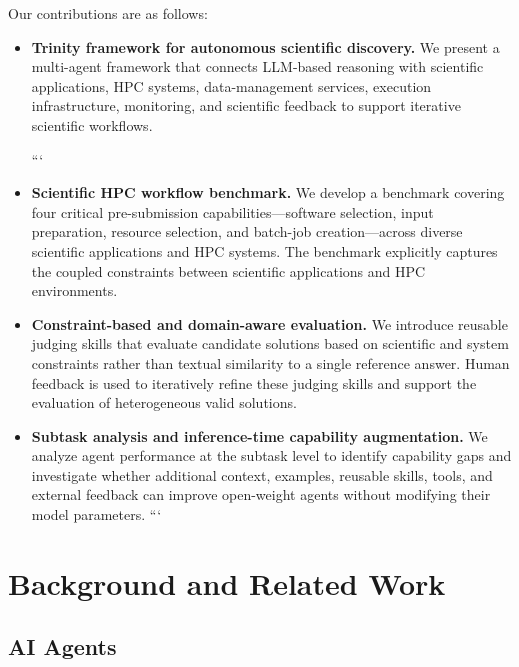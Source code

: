 \documentclass[conference]{IEEEtran}
\begin{document}
Our contributions are as follows:
\begin{itemize}
\item \textbf{Trinity framework for autonomous scientific discovery.} We present a multi-agent framework that connects LLM-based reasoning with scientific applications, HPC systems, data-management services, execution infrastructure, monitoring, and scientific feedback to support iterative scientific workflows.

```
\item \textbf{Scientific HPC workflow benchmark.} We develop a benchmark covering four critical pre-submission capabilities---software selection, input preparation, resource selection, and batch-job creation---across diverse scientific applications and HPC systems. The benchmark explicitly captures the coupled constraints between scientific applications and HPC environments.

\item \textbf{Constraint-based and domain-aware evaluation.} We introduce reusable judging skills that evaluate candidate solutions based on scientific and system constraints rather than textual similarity to a single reference answer. Human feedback is used to iteratively refine these judging skills and support the evaluation of heterogeneous valid solutions.

\item \textbf{Subtask analysis and inference-time capability augmentation.} We analyze agent performance at the subtask level to identify capability gaps and investigate whether additional context, examples, reusable skills, tools, and external feedback can improve open-weight agents without modifying their model parameters.
```

\end{itemize}

\section{Background and Related Work}\label{sec:related}

\subsection{AI Agents}
\end{document}
